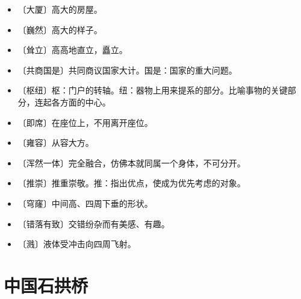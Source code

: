 \documentclass[12pt,UTF-8,openany]{ctexbook}
\begin{document}
\begin{itemize}
    \setlength\itemsep{-0.2em}
    \item 〔大厦〕高大的房屋。
    \item 〔巍然〕高大的样子。
    \item 〔耸立〕高高地直立，矗立。
    \item 〔共商国是〕共同商议国家大计。国是：国家的重大问题。
    \item 〔枢纽〕枢：门户的转轴。纽：器物上用来提系的部分。比喻事物的关键部分，连起各方面的中心。
    \item 〔即席〕在座位上，不用离开座位。
    \item 〔雍容〕从容大方。
    \item 〔浑然一体〕完全融合，仿佛本就同属一个身体，不可分开。
    \item 〔推崇〕推重崇敬。推：指出优点，使成为优先考虑的对象。
    \item 〔穹窿〕中间高、四周下垂的形状。
    \item 〔错落有致〕交错纷杂而有美感、有趣。
    \item 〔溅〕液体受冲击向四周飞射。
\end{itemize}

\chapter{中国石拱桥}
\end{document}
